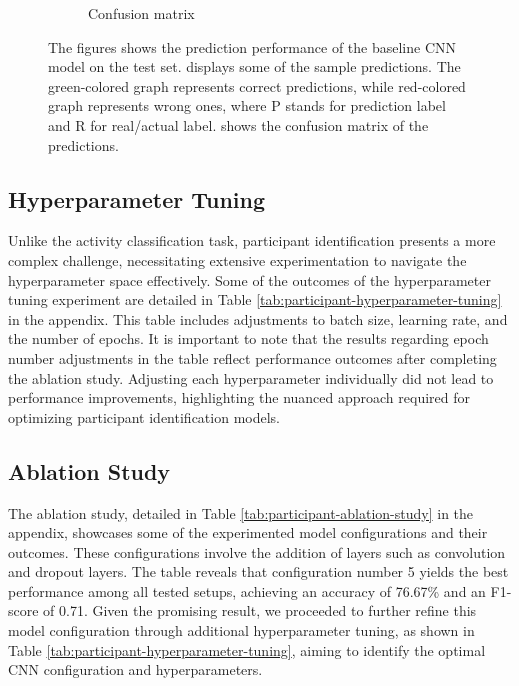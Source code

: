 \documentclass{l4proj}
\begin{document}
\begin{figure}[h]
\begin{subfigure}{0.4\textwidth}
        \caption{Confusion matrix}
        \label{fig:participant-initial-test-confusion-matrix}
    \end{subfigure}
  \caption{The figures shows the prediction performance of the baseline CNN model on the test set.  displays some of the sample predictions. The green-colored graph represents correct predictions, while red-colored graph represents wrong ones, where P stands for prediction label and R for real/actual label.  shows the confusion matrix of the predictions.}
  \label{fig:participant-initial-prediction-plots-and-confusion-matrix}
\end{figure}

\subsection{Hyperparameter Tuning}
Unlike the activity classification task, participant identification presents a more complex challenge, necessitating extensive experimentation to navigate the hyperparameter space effectively. Some of the outcomes of the hyperparameter tuning experiment are detailed in Table \ref{tab:participant-hyperparameter-tuning} in the appendix. This table includes adjustments to batch size, learning rate, and the number of epochs. It is important to note that the results regarding epoch number adjustments in the table reflect performance outcomes after completing the ablation study. Adjusting each hyperparameter individually did not lead to performance improvements, highlighting the nuanced approach required for optimizing participant identification models.

\subsection{Ablation Study}
The ablation study, detailed in Table \ref{tab:participant-ablation-study} in the appendix, showcases some of the experimented model configurations and their outcomes. These configurations involve the addition of layers such as convolution and dropout layers. The table reveals that configuration number 5 yields the best performance among all tested setups, achieving an accuracy of 76.67\% and an F1-score of 0.71. Given the promising result, we proceeded to further refine this model configuration through additional hyperparameter tuning, as shown in Table \ref{tab:participant-hyperparameter-tuning}, aiming to identify the optimal CNN configuration and hyperparameters.
\end{document}
